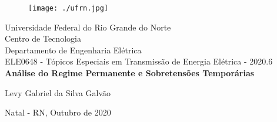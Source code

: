 \onehalfspacing
\begin{titlepage}
	\begin{center}
	
	\begin{figure}[!ht]
	\centering
	\texttt{[image: ./ufrn.jpg]}
	\end{figure}
		Universidade Federal do Rio Grande do Norte \\ Centro de Tecnologia \\ Departamento de Engenharia Elétrica \\ ELE0648 - Tópicos Especiais em Transmissão de Energia Elétrica  - 2020.6 \\
		\vspace{15pt}
        \vspace{95pt}
        \textbf{\Large{Análise do Regime Permanente e Sobretensões Temporárias}}\\
		\vspace{3,5cm}
	\end{center}
	
	\begin{flushright}
			\item Levy Gabriel da Silva Galvão 
 	\end{flushright}
	\vspace{1cm}
	
	\begin{center}
		\vspace{\fill}
		Natal - RN, Outubro de 2020
	\end{center}
\end{titlepage}





